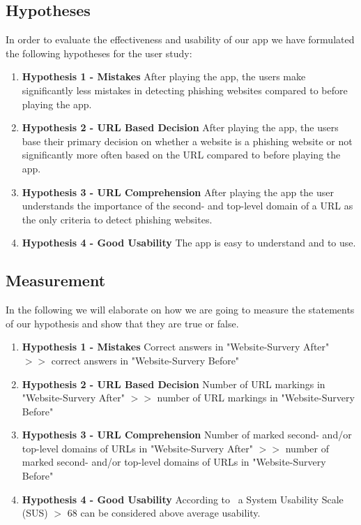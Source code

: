 \subsection{Hypotheses}
In order to evaluate the effectiveness and usability of our app we have formulated the following hypotheses for the user study:

\begin{enumerate}
	\item \textbf{Hypothesis 1 - Mistakes} After playing the app, the users make significantly less mistakes in detecting phishing websites compared to before playing the app.

	\item \textbf{Hypothesis 2 - URL Based Decision} After playing the app, the users base their primary decision on whether a website is a phishing website or not significantly more often based on the URL compared to before playing the app.

	\item \textbf{Hypothesis 3 - URL Comprehension} After playing the app the user understands the importance of the second- and top-level domain of a URL as the only criteria to detect phishing websites.

	\item \textbf{Hypothesis 4 - Good Usability} The app is easy to understand and to use.

\end{enumerate}


\subsection{Measurement}
In the following we will elaborate on how we are going to measure the statements of our hypothesis and show that they are true or false.


\begin{enumerate}
	\item \textbf{Hypothesis 1 - Mistakes} Correct answers in "Website-Survery After" $>>$ correct answers in "Website-Survery Before" 
	\item \textbf{Hypothesis 2 - URL Based Decision} Number of URL markings in "Website-Survery After" $>>$ number of URL markings in "Website-Survery Before" 
	\item \textbf{Hypothesis 3 - URL Comprehension} Number of marked second- and/or top-level domains of URLs in "Website-Survery After"  $>>$ number of marked second- and/or top-level domains of URLs in "Website-Survery Before" 
	\item \textbf{Hypothesis 4 - Good Usability} According to~\cite{sus}  a System Usability Scale (SUS) $>$ 68 can be considered above average usability.
\end{enumerate}

